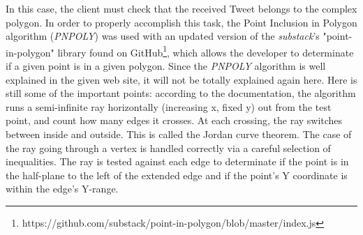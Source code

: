 \documentclass[a4paper,11pt]{report}
\begin{document}
\begin{itemize}
	In this case, the client must check that the received Tweet belongs to the complex polygon. In order to properly accomplish this task, the Point Inclusion in Polygon algorithm (\emph{PNPOLY})\cite{RandolphFranklin2016} was used with an updated version of the \emph{substack}'s "point-in-polygon" library found on GitHub\footnote{https://github.com/substack/point-in-polygon/blob/master/index.js}, which allows the developer to determinate if a given point is in a given polygon. Since the \emph{PNPOLY} algorithm is well explained in the given web site, it will not be totally explained again here. Here is still some of the important points: according to the documentation, the algorithm runs a semi-infinite ray horizontally (increasing x, fixed y) out from the test point, and count how many edges it crosses. At each crossing, the ray switches between inside and outside. This is called the Jordan curve theorem. The case of the ray going through a vertex is handled correctly via a careful selection of inequalities. The ray is tested against each edge to determinate if the point is in the half-plane to the left of the extended edge and if the point's Y coordinate is within the edge's Y-range.
\end{itemize}
\newpage
\end{document}
